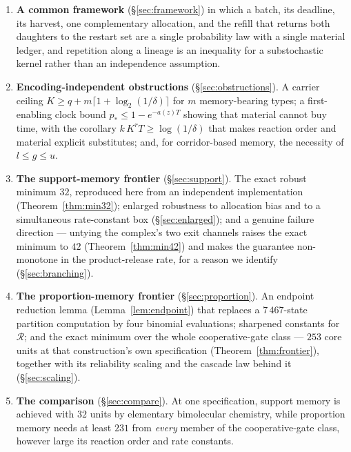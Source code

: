 \documentclass[11pt]{article}
\theoremstyle{plain}
\theoremstyle{definition}
\theoremstyle{remark}
\begin{document}
\begin{enumerate}\itemsep3pt
\item \textbf{A common framework} (\S\ref{sec:framework}) in which a batch,
its deadline, its harvest, one complementary allocation, and the refill that
returns both daughters to the restart set are a single probability law with a
single material ledger, and repetition along a lineage is an inequality for a
substochastic kernel rather than an independence assumption.

\item \textbf{Encoding-independent obstructions} (\S\ref{sec:obstructions}).
A carrier ceiling $K\ge q+m\lceil1+\log_2(1/\delta)\rceil$ for $m$
memory-bearing types; a first-enabling clock bound $p_*\le1-e^{-a(z)T}$ showing
that material cannot buy time, with the corollary $k\,K^{r}T\ge\log(1/\delta)$
that makes reaction order and material explicit substitutes; and, for
corridor-based memory, the necessity of $l\le g\le u$.

\item \textbf{The support-memory frontier} (\S\ref{sec:support}). The exact
robust minimum $32$, reproduced here from an independent implementation
(Theorem~\ref{thm:min32}); enlarged robustness to allocation bias and to a
simultaneous rate-constant box (\S\ref{sec:enlarged}); and a genuine failure
direction --- untying the complex's two exit channels raises the exact minimum
to $42$ (Theorem~\ref{thm:min42}) and makes the guarantee non-monotone in the
product-release rate, for a reason we identify (\S\ref{sec:branching}).

\item \textbf{The proportion-memory frontier} (\S\ref{sec:proportion}). An
endpoint reduction lemma (Lemma~\ref{lem:endpoint}) that replaces a
$7\,467$-state partition computation by four binomial evaluations; sharpened
constants for $\mathcal{R}$; and the exact minimum
over the whole cooperative-gate class --- $253$ core units at that
construction's own specification (Theorem~\ref{thm:frontier}), together with
its reliability scaling and the cascade law behind it
(\S\ref{sec:scaling}).

\item \textbf{The comparison} (\S\ref{sec:compare}). At one specification,
support memory is achieved with $32$ units by elementary bimolecular
chemistry, while proportion memory needs at least $231$ from \emph{every}
member of the cooperative-gate class, however large its reaction order and
rate constants.
\end{enumerate}
\end{document}
